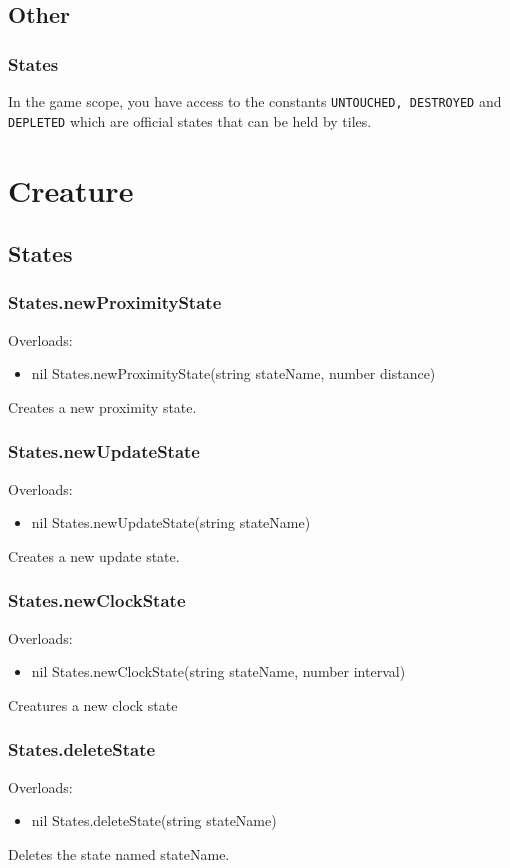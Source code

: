 \documentclass{book}
\newenvironment{ulist}
	{\begin{itemize}
			\itemsep0em}
	{\end{itemize}}
\begin{document}
\subsection{Other}
\subsubsection{States}
In the game scope, you have access to the constants \texttt{UNTOUCHED, DESTROYED} and \texttt{DEPLETED} which are official states that can be held by tiles.



\section{Creature}
\subsection{States}
\subsubsection{States.newProximityState}
Overloads:
\begin{ulist}
	\item nil States.newProximityState(string stateName, number distance)
\end{ulist}
Creates a new proximity state.

\subsubsection{States.newUpdateState}
Overloads:
\begin{ulist}
	\item nil States.newUpdateState(string stateName)
\end{ulist}
Creates a new update state.

\subsubsection{States.newClockState}
Overloads:
\begin{ulist}
	\item nil States.newClockState(string stateName, number interval)
\end{ulist}
Creatures a new clock state

\subsubsection{States.deleteState}
Overloads:
\begin{ulist}
	\item nil States.deleteState(string stateName)
\end{ulist}
Deletes the state named stateName.
\end{document}
